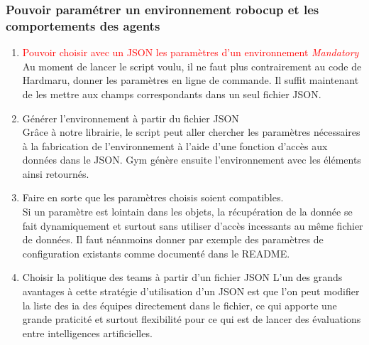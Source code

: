 \documentclass[11pt, a4paper]{article}
\begin{document}
	\subsubsection{Pouvoir paramétrer un environnement robocup et les comportements des agents}
	\begin{enumerate}
		\item \textcolor{red}{Pouvoir choisir avec un JSON les paramètres d'un environnement \textit{Mandatory}}\\
		Au moment de lancer le script voulu, il ne faut plus contrairement au code de Hardmaru, donner les paramètres
		en ligne de commande. Il suffit maintenant de les mettre aux champs correspondants dans un seul fichier JSON.

		\item Générer l'environnement à partir du fichier JSON\\
		Grâce à notre librairie, le script peut aller chercher les paramètres nécessaires à la fabrication
		de l'environnement à l'aide d'une fonction d'accès aux données dans le JSON.
		Gym génère ensuite l'environnement avec les éléments ainsi retournés.

		\item Faire en sorte que les paramètres choisis soient compatibles.\\
		Si un paramètre est lointain dans les objets, la récupération de la donnée se fait dynamiquement
		et surtout sans utiliser d'accès incessants au même fichier de données.
		Il faut néanmoins donner par exemple des paramètres de configuration existants comme documenté
		dans le README.

		\item Choisir la politique des teams à partir d'un fichier JSON
		L'un des grands avantages à cette stratégie d'utilisation d'un JSON est que l'on peut modifier
		la liste des ia des équipes directement dans le fichier, ce qui apporte une grande praticité et surtout
		flexibilité pour ce qui est de lancer des évaluations entre intelligences artificielles.
	\end{enumerate}
\end{document}
